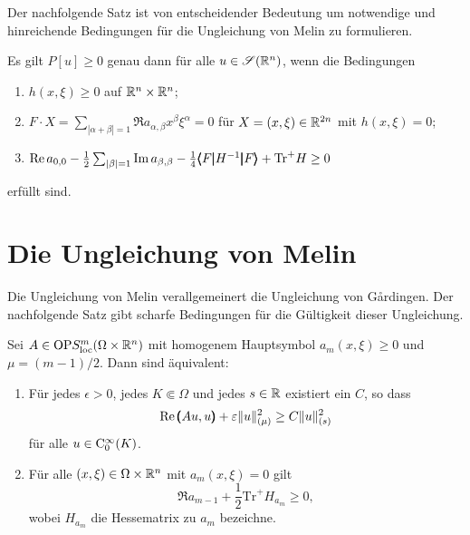 Der nachfolgende Satz ist von entscheidender Bedeutung um notwendige und hinreichende Bedingungen für die Ungleichung von Melin zu formulieren.

\begin{thm}
Es gilt $P[u]\ge0$ genau dann für alle $u\in\mathscr S(\mathbb R^n)$, wenn die Bedingungen
\begin{enumerate}
\item  $h(x,\xi)\ge0$ auf $\mathbb R^n\times\mathbb R^n$;
\item $F \cdot X = \sum_{|\alpha+\beta|=1} \Re a_{\alpha,\beta} x^\beta\xi^\alpha = 0$ für $X=(x,\xi)\in\mathbb R^{2n}$ mit $h(x,\xi)=0$;
\item $\operatorname{Re} a_{0,0} - \frac12 \sum_{|\beta|=1} \operatorname{Im} a_{\beta,\beta} -\frac14  \pmb\langle F\pmb|H^{-1}\pmb|F\pmb\rangle + {\mathrm{Tr}}^+ H \ge 0$
\end{enumerate}
erfüllt sind.
\end{thm}


\section{Die Ungleichung von Melin}

Die Ungleichung von Melin verallgemeinert die Ungleichung von G\r ardingen. Der nachfolgende Satz gibt scharfe Bedingungen für die Gültigkeit dieser Ungleichung.

\begin{thm}
Sei $A\in\mathrm{OP}S^m_{\rm loc}(\Omega\times\mathbb R^n)$ mit homogenem Hauptsymbol $a_m(x,\xi)\ge0$ und $\mu=(m-1)/2$. Dann sind \"aquivalent:
\begin{enumerate}
\item F\"ur jedes $\epsilon>0$, jedes $K\Subset\Omega$ und jedes $s\in\mathbb R$ existiert ein $C$, so dass
\begin{equation}
    \operatorname{Re} \pmb(Au,u\pmb) + \varepsilon \|u\|^2_{(\mu)}  \ge C\|u\|_{(s)}^2\label{ungleichungvonmelin}
\end{equation}
für alle $u\in\mathrm C_0^\infty(K)$.
\item
Für alle $(x,\xi)\in\Omega\times\mathbb R^n$ mit $a_m(x,\xi)=0$ gilt
\begin{equation}
   \Re a_{m-1} +  \frac 1 2 {\mathrm{Tr}}^+ H_{a_m} \ge 0,
\end{equation}
wobei $H_{a_m}$ die Hessematrix zu $a_m$ bezeichne.
\end{enumerate}
\end{thm}


